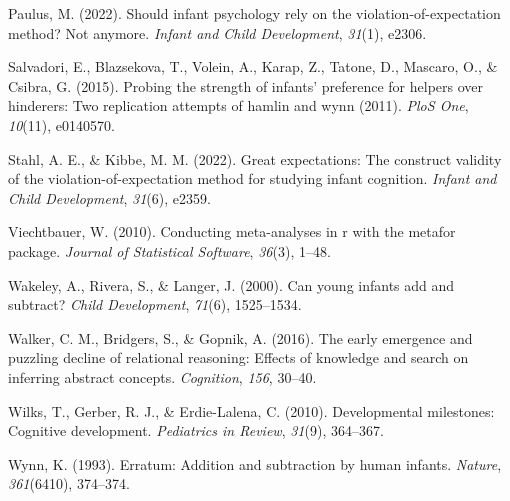 \documentclass[10pt, letterpaper]{article}
\newenvironment{CSLReferences}%
  {}%
  {\par}
\begin{document}
\begin{CSLReferences}{1}{0}
\leavevmode{}%
Paulus, M. (2022). Should infant psychology rely on the
violation-of-expectation method? Not anymore. \emph{Infant and Child
Development}, \emph{31}(1), e2306.

\leavevmode{}%
Salvadori, E., Blazsekova, T., Volein, A., Karap, Z., Tatone, D.,
Mascaro, O., \& Csibra, G. (2015). Probing the strength of infants'
preference for helpers over hinderers: Two replication attempts of
hamlin and wynn (2011). \emph{PloS One}, \emph{10}(11), e0140570.

\leavevmode{}%
Stahl, A. E., \& Kibbe, M. M. (2022). Great expectations: The construct
validity of the violation-of-expectation method for studying infant
cognition. \emph{Infant and Child Development}, \emph{31}(6), e2359.

\leavevmode{}%
Viechtbauer, W. (2010). Conducting meta-analyses in r with the metafor
package. \emph{Journal of Statistical Software}, \emph{36}(3), 1--48.

\leavevmode{}%
Wakeley, A., Rivera, S., \& Langer, J. (2000). Can young infants add and
subtract? \emph{Child Development}, \emph{71}(6), 1525--1534.

\leavevmode{}%
Walker, C. M., Bridgers, S., \& Gopnik, A. (2016). The early emergence
and puzzling decline of relational reasoning: Effects of knowledge and
search on inferring abstract concepts. \emph{Cognition}, \emph{156},
30--40.

\leavevmode{}%
Wilks, T., Gerber, R. J., \& Erdie-Lalena, C. (2010). Developmental
milestones: Cognitive development. \emph{Pediatrics in Review},
\emph{31}(9), 364--367.

\leavevmode{}%
Wynn, K. (1993). Erratum: Addition and subtraction by human infants.
\emph{Nature}, \emph{361}(6410), 374--374.

\end{CSLReferences}


\end{document}
